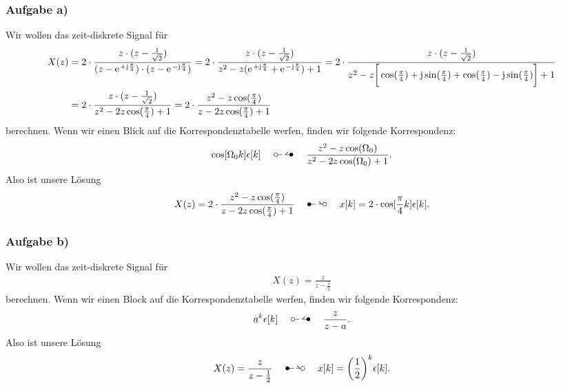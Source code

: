 \subsubsection{Aufgabe a)}
Wir wollen das zeit-diskrete Signal für
\begin{align}
	X(z)&=2\cdot\frac{z\cdot(z-\frac{1}{\sqrt{2}})}{(z-\e^{+\im\frac{\pi}{4}})\cdot(z-\e^{-\im\frac{\pi}{4}})}=2\cdot\frac{z\cdot(z-\frac{1}{\sqrt{2}})}{z^2-z(\e^{+\im\frac{\pi}{4}}+\e^{-\im\frac{\pi}{4}})+1}=2\cdot\frac{z\cdot(z-\frac{1}{\sqrt{2}})}{z^2-z\bigg[\cos(\frac{\pi}{4})+\im\sin(\frac{\pi}{4})+\cos(\frac{\pi}{4})-\im\sin(\frac{\pi}{4})\bigg ]+1}\nonumber\\
	&=2\cdot\frac{z\cdot(z-\frac{1}{\sqrt{2}})}{z^2-2z\cos(\frac{\pi}{4})+1}=2\cdot\frac{z^2-z\cos(\frac{\pi}{4})}{z-2z\cos(\frac{\pi}{4})+1}
\end{align}
berechnen.
Wenn wir einen Blick auf die Korrespondenztabelle werfen, finden wir folgende Korrespondenz:
\begin{align}
	\cos[\Omega_0k]\epsilon[k]\quad\ztransf\quad\frac{z^2-z\cos(\Omega_0)}{z^2-2z\cos(\Omega_0)+1}.
\end{align}
Also ist unsere Lösung
\begin{align}
	X(z)=2\cdot\frac{z^2-z\cos(\frac{\pi}{4})}{z-2z\cos(\frac{\pi}{4})+1}\quad\Ztransf\quad x[k]=2\cdot\cos[\frac{\pi}{4}k]\epsilon[k].
\end{align}
\subsubsection{Aufgabe b)}
Wir wollen das zeit-diskrete Signal für
\begin{align}
	X(z)=\frac{z}{z-\frac{1}{2}}
\end{align}
berechnen.
Wenn wir einen Block auf die Korrespondenztabelle werfen, finden wir folgende Korrespondenz:
\begin{align}
	\label{eq:GeometricProgression}
	a^k\epsilon[k]\quad\ztransf\quad\frac{z}{z-a}.
\end{align}
Also ist unsere Lösung
\begin{align}
	X(z)=\frac{z}{z-\frac{1}{2}}\quad\Ztransf\quad x[k]=\bigg (\frac{1}{2}\bigg)^k\epsilon[k].
\end{align}
